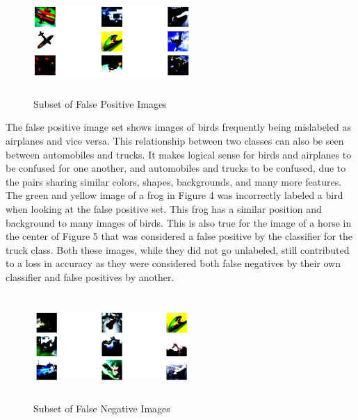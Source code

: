 \documentclass[10pt,twocolumn,letterpaper]{article}
\begin{document}
\begin{figure}[H]
	\begin{center}
		\includegraphics[width=6cm,height=4cm]{SomeFalsePositives.png}
	\end{center}
	\caption{Subset of False Positive Images}
\end{figure}

The false positive image set shows images of birds frequently being mislabeled as airplanes and vice versa. This relationship between two classes can also be seen between automobiles and trucks. It makes logical sense for birds and airplanes to be confused for one another, and automobiles and trucks to be confused, due to the pairs sharing similar colors, shapes, backgrounds, and many more features. The green and yellow image of a frog in Figure  4 was incorrectly labeled a bird when looking at the false positive set. This frog has a similar position and background to many images of birds. This is also true for the image of a horse in the center of Figure 5 that was considered a false positive by the classifier for the truck class. Both these images, while they did not go unlabeled, still contributed to a loss in accuracy as they were considered both false negatives by their own classifier and false positives by another.

\begin{figure}[H]
	\begin{center}
		\includegraphics[width=6cm,height=4cm]{SomeFalseNegatives.png}
	\end{center}
	\caption{Subset of False Negative Images}
\end{figure}
\end{document}
